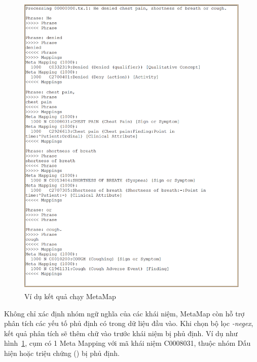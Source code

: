 \begin{figure}[h]
\centering
\includegraphics[scale=0.35]{../hinh/metamapsample.png}
\caption{Ví dụ kết quả chạy MetaMap}
\label{fig:metamapsample}
\end{figure}

Không chỉ xác định nhóm ngữ nghĩa của các khái niệm, MetaMap còn hỗ trợ phân tích các yếu tố phủ định có trong dữ liệu đầu vào. Khi chọn bộ lọc \textit{-negex}, kết quả phân tích sẽ thêm chữ  vào trước khái niệm bị phủ định. Ví dụ như hình~\ref{fig:metamapsample}, cụm  có 1 Meta Mapping với mã khái niệm C0008031, thuộc nhóm Dấu hiện hoặc triệu chứng () bị phủ định.
